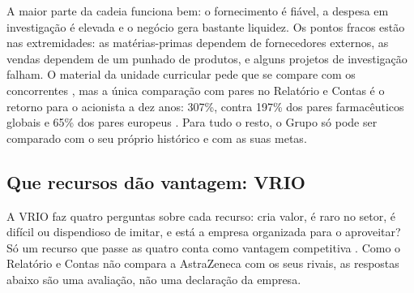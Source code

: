 \begin{analysis}
A maior parte da cadeia funciona bem: o fornecimento é fiável, a despesa em investigação é elevada e o negócio gera bastante liquidez. Os pontos fracos estão nas extremidades: as matérias-primas dependem de fornecedores externos, as vendas dependem de um punhado de produtos, e alguns projetos de investigação falham. O material da unidade curricular pede que se compare com os concorrentes \cite[p.~24]{PLAN}, mas a única comparação com pares no Relatório e Contas é o retorno para o acionista a dez anos: 307\%, contra 197\% dos pares farmacêuticos globais e 65\% dos pares europeus \cite[p.~90]{AR}. Para tudo o resto, o Grupo só pode ser comparado com o seu próprio histórico e com as suas metas.
\end{analysis}

\subsection{Que recursos dão vantagem: VRIO}
A VRIO faz quatro perguntas sobre cada recurso: cria valor, é raro no setor, é difícil ou dispendioso de imitar, e está a empresa organizada para o aproveitar? Só um recurso que passe as quatro conta como vantagem competitiva \cite[p.~26]{PLAN}. Como o Relatório e Contas não compara a AstraZeneca com os seus rivais, as respostas abaixo são uma avaliação, não uma declaração da empresa.

